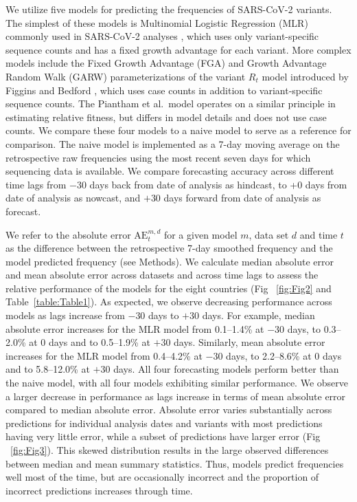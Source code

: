 \documentclass[10pt,letterpaper]{article}
\begin{document}
We utilize five models for predicting the frequencies of SARS-CoV-2 variants.
The simplest of these models is Multinomial Logistic Regression (MLR) commonly used in SARS-CoV-2 analyses \cite{annavajhala2021emergence, faria2021genomics, obermeyer2022analysis, susswein2023early}, which uses only variant-specific sequence counts and has a fixed growth advantage for each variant.
More complex models include the Fixed Growth Advantage (FGA) and Growth Advantage Random Walk (GARW) parameterizations of the variant $R_t$ model introduced by Figgins and Bedford \cite{figgins2022sars}, which uses case counts in addition to variant-specific sequence counts.
The Piantham et al.\ model \cite{piantham2021estimating} operates on a similar principle in estimating relative fitness, but differs in model details and does not use case counts.
We compare these four models to a naive model to serve as a reference for comparison.
The naive model is implemented as a 7-day moving average on the retrospective raw frequencies using the most recent seven days for which sequencing data is available.
We compare forecasting accuracy across different time lags from $-30$ days back from date of analysis as hindcast, to +0 days from date of analysis as nowcast, and $+30$ days forward from date of analysis as forecast.


We refer to the absolute error $\mathrm{AE}_{t}^{m,d}$ for a given model $m$, data set $d$ and time $t$ as the difference between the retrospective 7-day smoothed frequency and the model predicted frequency (see Methods).
We calculate median absolute error and mean absolute error across datasets and across time lags to assess the relative performance of the models for the eight countries (Fig ~\ref{fig:Fig2} and Table~\ref{table:Table1}).
As expected, we observe decreasing performance across models as lags increase from $-30$ days to $+30$ days.
For example, median absolute error increases for the MLR model from 0.1--1.4\% at $-30$ days, to 0.3--2.0\% at 0 days and to 0.5--1.9\% at $+30$ days.
Similarly, mean absolute error increases for the MLR model from 0.4--4.2\% at $-30$ days, to 2.2--8.6\% at 0 days and to 5.8--12.0\% at $+30$ days.
All four forecasting models perform better than the naive model, with all four models exhibiting similar performance.
We observe a larger decrease in performance as lags increase in terms of mean absolute error compared to median absolute error.
Absolute error varies substantially across predictions for individual analysis dates and variants with most predictions having very little error, while a subset of predictions have larger error (Fig ~\ref{fig:Fig3}).
This skewed distribution results in the large observed differences between median and mean summary statistics.
Thus, models predict frequencies well most of the time, but are occasionally incorrect and the proportion of incorrect predictions increases through time.
\end{document}
